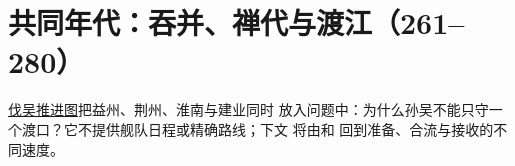 \chapter{共同年代：吞并、禅代与渡江（261--280）}
\label{ch:society-texts}


\hyperref[fig:vol02b:jin-conquest-wu]{伐吴推进图}把益州、荆州、淮南与建业同时
放入问题中：为什么孙吴不能只守一个渡口？它不提供舰队日程或精确路线；下文
将由和
回到准备、合流与接收的不同速度。

